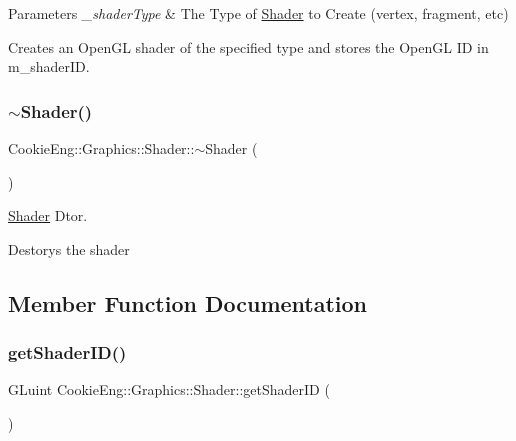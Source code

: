 \begin{DoxyParams}{Parameters}
{\em \+\_\+shader\+Type} & The Type of \hyperlink{class_cookie_eng_1_1_graphics_1_1_shader}{Shader} to Create (vertex, fragment, etc)\\
\hline
\end{DoxyParams}
Creates an Open\+GL shader of the specified type and stores the Open\+GL ID in m\+\_\+shader\+ID. \mbox{\label{class_cookie_eng_1_1_graphics_1_1_shader_a0c90d1cf0ddfb5f9aef80fd196bbf890}} 
\subsubsection{\texorpdfstring{$\sim$\+Shader()}{~Shader()}}
{\footnotesize\ttfamily Cookie\+Eng\+::\+Graphics\+::\+Shader\+::$\sim$\+Shader (\begin{DoxyParamCaption}{ }\end{DoxyParamCaption})\hspace{0.3cm}{\ttfamily [inline]}}



\hyperlink{class_cookie_eng_1_1_graphics_1_1_shader}{Shader} Dtor. 

Destorys the shader 

\subsection{Member Function Documentation}
\mbox{\label{class_cookie_eng_1_1_graphics_1_1_shader_a4d3333267a9bbdaf9157a59120cf8b51}} 
\subsubsection{\texorpdfstring{get\+Shader\+I\+D()}{getShaderID()}}
{\footnotesize\ttfamily G\+Luint Cookie\+Eng\+::\+Graphics\+::\+Shader\+::get\+Shader\+ID (\begin{DoxyParamCaption}{ }\end{DoxyParamCaption})\hspace{0.3cm}{\ttfamily [inline]}}



